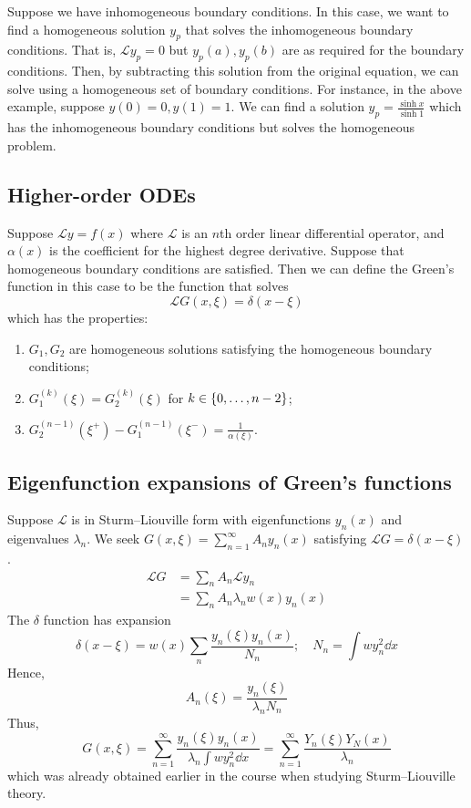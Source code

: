 Suppose we have inhomogeneous boundary conditions.
In this case, we want to find a homogeneous solution \( y_p \) that solves the inhomogeneous boundary conditions.
That is, \( \mathcal L y_p = 0 \) but \( y_p(a), y_p(b) \) are as required for the boundary conditions.
Then, by subtracting this solution from the original equation, we can solve using a homogeneous set of boundary conditions.
For instance, in the above example, suppose \( y(0) = 0, y(1) = 1 \).
We can find a solution \( y_p = \frac{\sinh x}{\sinh 1} \) which has the inhomogeneous boundary conditions but solves the homogeneous problem.

\subsection{Higher-order ODEs}
Suppose \( \mathcal L y = f(x) \) where \( \mathcal L \) is an \( n \)th order linear differential operator, and \( \alpha(x) \) is the coefficient for the highest degree derivative.
Suppose that homogeneous boundary conditions are satisfied.
Then we can define the Green's function in this case to be the function that solves
\[
	\mathcal L G(x,\xi) = \delta(x-\xi)
\]
which has the properties:
\begin{enumerate}
	\item \( G_1, G_2 \) are homogeneous solutions satisfying the homogeneous boundary conditions;
	\item \( G_1^{(k)}(\xi) = G_2^{(k)}(\xi) \) for \( k \in \qty{0, \dots, n-2} \);
	\item \( G_2^{(n-1)}(\xi^+) - G_1^{(n-1)}(\xi^-) = \frac{1}{\alpha(\xi)} \).
\end{enumerate}

\subsection{Eigenfunction expansions of Green's functions}
Suppose \( \mathcal L \) is in Sturm--Liouville form with eigenfunctions \( y_n(x) \) and eigenvalues \( \lambda_n \).
We seek \( G(x,\xi) = \sum_{n=1}^\infty A_n y_n(x) \) satisfying \( \mathcal L G = \delta(x-\xi) \).
\begin{align*}
	\mathcal L G & = \sum_n A_n \mathcal L y_n        \\
	             & = \sum_n A_n \lambda_n w(x) y_n(x)
\end{align*}
The \( \delta \) function has expansion
\[
	\delta(x-\xi) = w(x) \sum_n \frac{y_n(\xi) y_n(x)}{N_n};\quad N_n = \int w y_n^2 \dd{x}
\]
Hence,
\[
	A_n(\xi) = \frac{y_n(\xi)}{\lambda_n N_n}
\]
Thus,
\[
	G(x,\xi) = \sum_{n=1}^\infty \frac{y_n(\xi) y_n(x)}{\lambda_n \int w y_n^2 \dd{x}} = \sum_{n=1}^\infty \frac{Y_n(\xi) Y_N(x)}{\lambda_n}
\]
which was already obtained earlier in the course when studying Sturm--Liouville theory.

